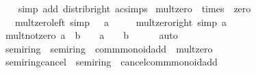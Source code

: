 \begin{isabellebody}
%
\isadelimproof
\ \ %
\endisadelimproof
%
\isatagproof
{}\isamarkupfalse%
\ {\isacharparenleft}{\kern0pt}simp\ add{\isacharcolon}{\kern0pt}\ distrib{\isacharunderscore}{\kern0pt}right\ ac{\isacharunderscore}{\kern0pt}simps{\isacharparenright}{\kern0pt}%
\endisatagproof
{\isafoldproof}%
%
\isadelimproof
\isanewline
%
\endisadelimproof
\isanewline
{}\isamarkupfalse%
\isanewline
\isanewline
{}\isamarkupfalse%
\ mult{\isacharunderscore}{\kern0pt}zero\ {\isacharequal}{\kern0pt}\ times\ {\isacharplus}{\kern0pt}\ zero\ {\isacharplus}{\kern0pt}\isanewline
\ \ \ mult{\isacharunderscore}{\kern0pt}zero{\isacharunderscore}{\kern0pt}left\ {\isacharbrackleft}{\kern0pt}simp{\isacharbrackright}{\kern0pt}{\isacharcolon}{\kern0pt}\ {\isachardoublequoteopen}{}\ {\isacharasterisk}{\kern0pt}\ a\ {\isacharequal}{\kern0pt}\ {}{\isachardoublequoteclose}\isanewline
\ \ \ mult{\isacharunderscore}{\kern0pt}zero{\isacharunderscore}{\kern0pt}right\ {\isacharbrackleft}{\kern0pt}simp{\isacharbrackright}{\kern0pt}{\isacharcolon}{\kern0pt}\ {\isachardoublequoteopen}a\ {\isacharasterisk}{\kern0pt}\ {}\ {\isacharequal}{\kern0pt}\ {}{\isachardoublequoteclose}\isanewline
{}\isanewline
\isanewline
{}\isamarkupfalse%
\ mult{\isacharunderscore}{\kern0pt}not{\isacharunderscore}{\kern0pt}zero{\isacharcolon}{\kern0pt}\ {\isachardoublequoteopen}a\ {\isacharasterisk}{\kern0pt}\ b\ {\isasymnoteq}\ {}\ {\isasymLongrightarrow}\ a\ {\isasymnoteq}\ {}\ {\isasymand}\ b\ {\isasymnoteq}\ {}{\isachardoublequoteclose}\isanewline
%
\isadelimproof
\ \ %
\endisadelimproof
%
\isatagproof
{}\isamarkupfalse%
\ auto%
\endisatagproof
{\isafoldproof}%
%
\isadelimproof
\isanewline
%
\endisadelimproof
\isanewline
{}\isamarkupfalse%
\isanewline
\isanewline
{}\isamarkupfalse%
\ semiring{\isacharunderscore}{\kern0pt}{}\ {\isacharequal}{\kern0pt}\ semiring\ {\isacharplus}{\kern0pt}\ comm{\isacharunderscore}{\kern0pt}monoid{\isacharunderscore}{\kern0pt}add\ {\isacharplus}{\kern0pt}\ mult{\isacharunderscore}{\kern0pt}zero\isanewline
\isanewline
{}\isamarkupfalse%
\ semiring{\isacharunderscore}{\kern0pt}{}{\isacharunderscore}{\kern0pt}cancel\ {\isacharequal}{\kern0pt}\ semiring\ {\isacharplus}{\kern0pt}\ cancel{\isacharunderscore}{\kern0pt}comm{\isacharunderscore}{\kern0pt}monoid{\isacharunderscore}{\kern0pt}add\isanewline
{}\isanewline

\end{isabellebody}
